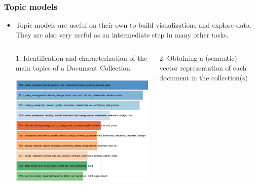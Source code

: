 \documentclass{beamer}
\begin{document}
\begin{frame}

    \frametitle{Topic models}

	\footnotesize

    \begin{itemize}
  
		\item Topic models are useful on their own to build visualizations and explore data. They are also very useful as an intermediate step in many other tasks.
		
        \begin{columns}
        \begin{column}{0.48\textwidth}
        \begin{exampleblock}{1. Identification and characterization of the main topics of a Document Collection}
           \centerline{\includegraphics[width=\textwidth]{./figs/topics.png}}
        \end{exampleblock}
        \end{column}
        \begin{column}{0.48\textwidth}  %
        \begin{exampleblock}{2. Obtaining a (semantic) vector representation of each document in the collection(s)}

\end{exampleblock}
\end{column}
\end{columns}
\end{itemize}
\end{frame}
\end{document}
